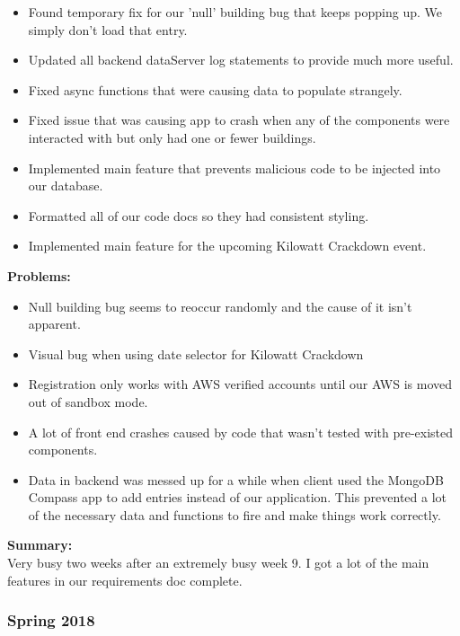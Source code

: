 \begin{adjustwidth}{2.5em}{0pt}
\begin{itemize}
        \item Found temporary fix for our 'null' building bug that keeps popping up. We simply don't load that entry. 
        \item Updated all backend dataServer log statements to provide much more useful. 
        \item Fixed async functions that were causing data to populate strangely. 
        \item Fixed issue that was causing app to crash when any of the components were interacted with but only had one or fewer buildings. 
        \item Implemented main feature that prevents malicious code to be injected into our database. 
        \item Formatted all of our code docs so they had consistent styling. 
        \item Implemented main feature for the upcoming Kilowatt Crackdown event. 


    \end{itemize} 
    \vspace{-0.3cm}\textbf{Problems:}
    \vspace{-0.5cm}
    \begin{itemize}
        \item Null building bug seems to reoccur randomly and the cause of it isn't apparent. 
        \item Visual bug when using date selector for Kilowatt Crackdown 
        \item Registration only works with AWS verified accounts until our AWS is moved out of sandbox mode. 
        \item A lot of front end crashes caused by code that wasn't tested with pre-existed components. 
        \item Data in backend was messed up for a while when client used the MongoDB Compass app to add entries instead of our application. This prevented a lot of the necessary data and functions to fire and make things work correctly. 
    \end{itemize} 
    \vspace{-0.3cm}\noindent\textbf{Summary:}\\
    \noindent Very busy two weeks after an extremely busy week 9. I got a lot of the main features in our requirements doc complete.
\end{adjustwidth} 
\subsubsection{Spring 2018}
